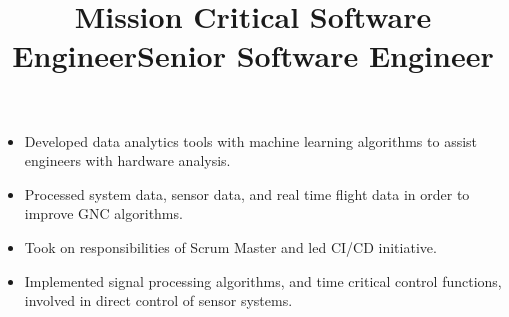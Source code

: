 \documentclass[margin]{res}
\begin{document}
\begin{resume}
	\title{\textbf{Mission Critical Software Engineer}}
	\begin{position}
		\begin{itemize}[noitemsep, topsep=0pt]
			\item Developed data analytics tools with machine learning algorithms to assist engineers with hardware analysis.
			\item Processed system data, sensor data, and real time flight data in order to improve GNC algorithms.
			\item Took on responsibilities of Scrum Master and led CI/CD initiative.
		\end{itemize}
	\end{position}

	\title{\textbf{Senior Software Engineer}}
	\begin{position}
		\begin{itemize}[noitemsep, topsep=0pt]
			\item Implemented signal processing algorithms, and time critical control functions, involved in direct control of sensor systems.
		\end{itemize}
	\end{position}


\end{resume}
\end{document}
